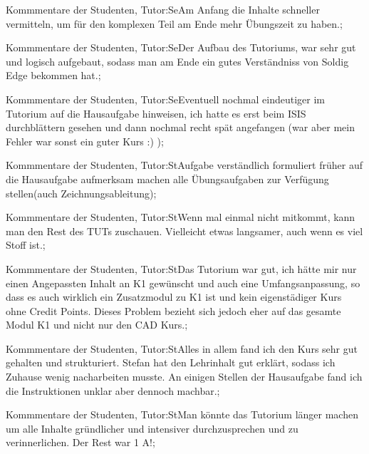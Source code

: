 \documentclass[10pt]{beamer}
\begin{document}
\begin{frame}[fragile]{Kommmentare der Studenten, Tutor:Se}Am Anfang die Inhalte schneller vermitteln, um für den komplexen Teil am Ende mehr Übungszeit zu haben.;
 \end{frame}
\begin{frame}[fragile]{Kommmentare der Studenten, Tutor:Se}Der Aufbau des Tutoriums, war sehr gut und logisch aufgebaut, sodass man am Ende ein gutes Verständniss von Soldig Edge bekommen hat.;
 \end{frame}
\begin{frame}[fragile]{Kommmentare der Studenten, Tutor:Se}Eventuell nochmal eindeutiger im Tutorium auf die Hausaufgabe hinweisen, ich hatte es erst beim ISIS durchblättern gesehen und dann nochmal recht spät angefangen (war aber mein Fehler   war sonst ein guter Kurs :) );
 \end{frame}
\begin{frame}[fragile]{Kommmentare der Studenten, Tutor:St}Aufgabe verständlich formuliert
 früher auf die Hausaufgabe aufmerksam machen
 alle Übungsaufgaben zur Verfügung stellen(auch Zeichnungsableitung);
 \end{frame}
\begin{frame}[fragile]{Kommmentare der Studenten, Tutor:St}Wenn mal einmal nicht mitkommt, kann man den Rest des TUTs zuschauen. Vielleicht etwas langsamer, auch wenn es viel Stoff ist.;
 \end{frame}
\begin{frame}[fragile]{Kommmentare der Studenten, Tutor:St}Das Tutorium war gut, ich hätte mir nur einen Angepassten Inhalt an K1 gewünscht und auch eine Umfangsanpassung, so dass es auch wirklich ein Zusatzmodul zu K1 ist und kein eigenstädiger Kurs ohne Credit Points. Dieses Problem bezieht sich jedoch eher auf das gesamte Modul K1 und nicht nur den CAD Kurs.;
 \end{frame}
\begin{frame}[fragile]{Kommmentare der Studenten, Tutor:St}Alles in allem fand ich den Kurs sehr gut gehalten und strukturiert. Stefan hat den Lehrinhalt gut erklärt, sodass ich Zuhause wenig nacharbeiten musste. 
 An einigen Stellen der Hausaufgabe fand ich die Instruktionen unklar aber dennoch machbar.;
 \end{frame}
\begin{frame}[fragile]{Kommmentare der Studenten, Tutor:St}Man könnte das Tutorium länger machen um alle Inhalte gründlicher und intensiver durchzusprechen und zu verinnerlichen. Der Rest war 1 A!;
 \end{frame}
\end{document}
